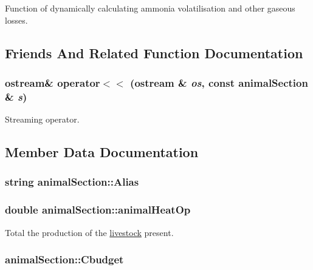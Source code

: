 Function of dynamically calculating ammonia volatilisation and other gaseous losses. 

\subsection{Friends And Related Function Documentation}
\hypertarget{classanimal_section_afc0c5d745b4e8cb42de23c61aa1e2738}{
\subsubsection[{operator$<$$<$}]{\setlength{\rightskip}{0pt plus 5cm}ostream\& operator$<$$<$ (ostream \& {\em os}, \/  const {\bf animalSection} \& {\em s})}}
\label{classanimal_section_afc0c5d745b4e8cb42de23c61aa1e2738}


Streaming operator. 

\subsection{Member Data Documentation}
\hypertarget{classanimal_section_ae78e07631b9b3eec8795a89357456417}{
\subsubsection[{Alias}]{\setlength{\rightskip}{0pt plus 5cm}string {\bf animalSection::Alias}}}
\label{classanimal_section_ae78e07631b9b3eec8795a89357456417}
\hypertarget{classanimal_section_aa615ab24431c87f4f728294d797cff06}{
\subsubsection[{animalHeatOp}]{\setlength{\rightskip}{0pt plus 5cm}double {\bf animalSection::animalHeatOp}}}
\label{classanimal_section_aa615ab24431c87f4f728294d797cff06}


Total the production of the \hyperlink{classlivestock}{livestock} present. \hypertarget{classanimal_section_a6b36f885be582b5d2c9c32bbe8792cc8}{
\subsubsection[{Cbudget}]{ {\bf animalSection::Cbudget}}}
\label{classanimal_section_a6b36f885be582b5d2c9c32bbe8792cc8}


